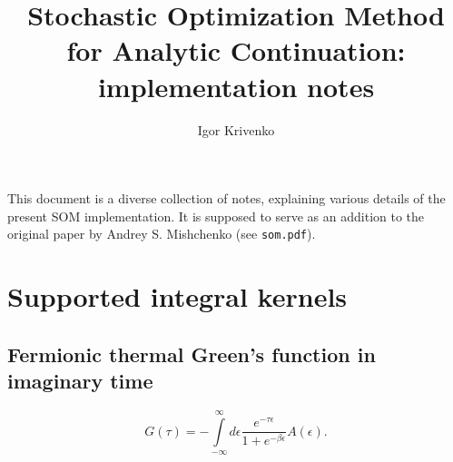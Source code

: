\documentclass[]{article}
\title{Stochastic Optimization Method for Analytic Continuation: implementation notes}
\author{Igor Krivenko}
\begin{document}
\maketitle

This document is a diverse collection of notes, explaining various details of the present SOM implementation.
It is supposed to serve as an addition to the original paper by Andrey S. Mishchenko (see \verb|som.pdf|).

\section{Supported integral kernels}
\subsection{Fermionic thermal Green's function in imaginary time}

\begin{equation}
	G(\tau) = -\int\limits_{-\infty}^\infty
	d\epsilon \frac{e^{-\tau\epsilon}}{1+e^{-\beta\epsilon}} A(\epsilon).
\end{equation}
\end{document}

